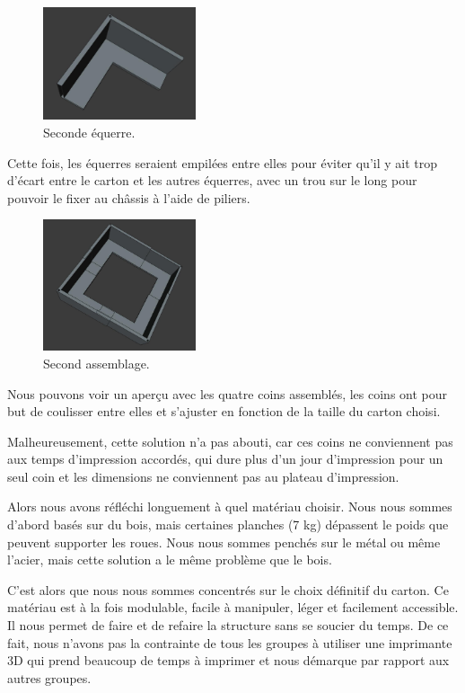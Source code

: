 \documentclass[a4paper,12pt]{report}  %
\begin{document}
\begin{figure}[H]
	\centering
	\includegraphics[width=0.4\textwidth]{./attachments/cad_equerre_v2.jpg}
	\caption{Seconde équerre.}
\end{figure}

Cette fois, les équerres seraient empilées entre elles pour éviter qu’il y ait trop d’écart entre le carton et les autres équerres, avec un trou sur le long pour pouvoir le fixer au châssis à l’aide de piliers.

\begin{figure}[H]
	\centering
	\includegraphics[width=0.4\textwidth]{./attachments/cad_assemblage_v2.jpg}
	\caption{Second assemblage.}
\end{figure}

Nous pouvons voir un aperçu avec les quatre coins assemblés, les coins ont pour but de coulisser entre elles et s’ajuster en fonction de la taille du carton choisi.

Malheureusement, cette solution n’a pas abouti, car ces coins ne conviennent pas aux temps d’impression accordés, qui dure plus d’un jour d’impression pour un seul coin et les dimensions ne conviennent pas au plateau d’impression.

Alors nous avons réfléchi longuement à quel matériau choisir. Nous nous sommes d’abord basés sur du bois, mais certaines planches (7 kg) dépassent le poids que peuvent supporter les roues. Nous nous sommes penchés sur le métal ou même l’acier, mais cette solution a le même problème que le bois. 

C’est alors que nous nous sommes concentrés sur le choix définitif du carton. Ce matériau est à la fois modulable, facile à manipuler, léger et facilement accessible. Il nous permet de faire et de refaire la structure sans se soucier du temps. De ce fait, nous n’avons pas la contrainte de tous les groupes à utiliser une imprimante 3D qui prend beaucoup de temps à imprimer et nous démarque par rapport aux autres groupes.
\end{document}

